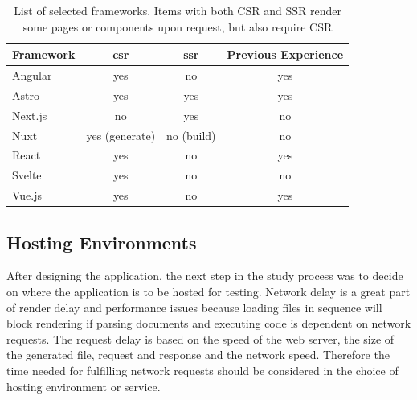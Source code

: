 \documentclass[a4paper, 10pt]{article}
\begin{document}
\begin{table}
  \begin{center}
    \begin{tabular}[h]{l c c c }
      \textbf{Framework} & \textbf{\acrshort{csr}} & \textbf{\acrshort{ssr}} & \textbf{Previous Experience} \\ \hline
      Angular & yes & no & yes \\ \hline
      Astro   & yes & yes & yes \\ \hline
      Next.js & no & yes & no \\ \hline
      Nuxt    & yes (generate) & no (build) & no \\ \hline
      React   & yes & no & yes \\ \hline
      Svelte  & yes & no & no \\ \hline
      Vue.js  & yes & no & yes \\ 
    \end{tabular}
  \end{center}
  \caption{List of selected frameworks. Items with both CSR and SSR render some pages or components upon request, but also require CSR}\label{tab:frameworks}
\end{table}


\subsection{Hosting Environments}\label{subsec:hostingenvironments}
% 
% 

After designing the application, the next step in the study process was to decide on where the application is to be hosted for testing.
Network delay is a great part of render delay and performance issues %
because loading files in sequence will block rendering if parsing documents and executing code is dependent on network requests.
The request delay is based on the speed of the web server, the size of the generated file, request and response and the network speed.
Therefore the time needed for fulfilling network requests should be considered in the choice of hosting environment or service.
\end{document}
